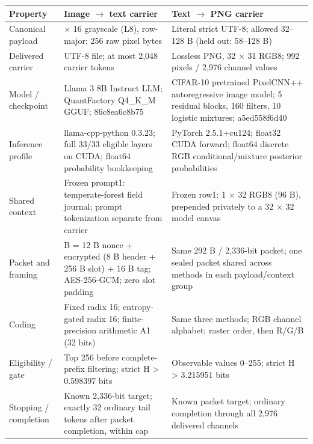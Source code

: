 \begin{table}[t]
\centering
\small
\setlength{\tabcolsep}{3pt}
\ifdefined\pubtablewidth\else\newlength{\pubtablewidth}\fi
\setlength{\pubtablewidth}{\dimexpr\linewidth-12pt\relax}
\begin{tabular}{@{}>{\raggedright\arraybackslash}p{0.180\pubtablewidth}>{\raggedright\arraybackslash}p{0.410\pubtablewidth}>{\raggedright\arraybackslash}p{0.410\pubtablewidth}@{}}
\toprule
\textbf{Property} & \textbf{Image $\rightarrow$ text carrier} & \textbf{Text $\rightarrow$ PNG carrier} \\
\midrule
Canonical payload & 16 $\times$ 16 grayscale (L8), row-major; 256 raw pixel bytes & Literal strict UTF-8; allowed 32--128 B (held out: 58--128 B) \\[4pt]
Delivered carrier & UTF-8 file; at most 2,048 carrier tokens & Lossless PNG, 32 $\times$ 31 RGB8; 992 pixels / 2,976 channel values \\[4pt]
Model / checkpoint & Llama 3 8B Instruct LLM; QuantFactory Q4\_K\_M GGUF; 86c8ea6c8b75 & CIFAR-10 pretrained PixelCNN++ autoregressive image model; 5 residual blocks, 160 filters, 10 logistic mixtures; a5ed558f6d40 \\[4pt]
Inference profile & llama-cpp-python 0.3.23; full 33/33 eligible layers on CUDA; float64 probability bookkeeping & PyTorch 2.5.1+cu124; float32 CUDA forward; float64 discrete RGB conditional/mixture posterior probabilities \\[4pt]
Shared context & Frozen prompt1: temperate-forest field journal; prompt tokenization separate from carrier & Frozen row1: 1 $\times$ 32 RGB8 (96 B), prepended privately to a 32 $\times$ 32 model canvas \\[4pt]
Packet and framing & 292 B = 12 B nonce + encrypted (8 B header + 256 B slot) + 16 B tag; AES-256-GCM; zero slot padding & Same 292 B / 2,336-bit packet; one sealed packet shared across methods in each payload/context group \\[4pt]
Coding & Fixed radix 16; entropy-gated radix 16; finite-precision arithmetic A1 (32 bits) & Same three methods; RGB channel alphabet; raster order, then R/G/B \\[4pt]
Eligibility / gate & Top 256 before complete-prefix filtering; strict H > 0.598397 bits & Observable values 0--255; strict H > 3.215951 bits \\[4pt]
Stopping / completion & Known 2,336-bit target; exactly 32 ordinary tail tokens after packet completion, within cap & Known packet target; ordinary completion through all 2,976 delivered channels \\[4pt]

\end{tabular}
\end{table}
